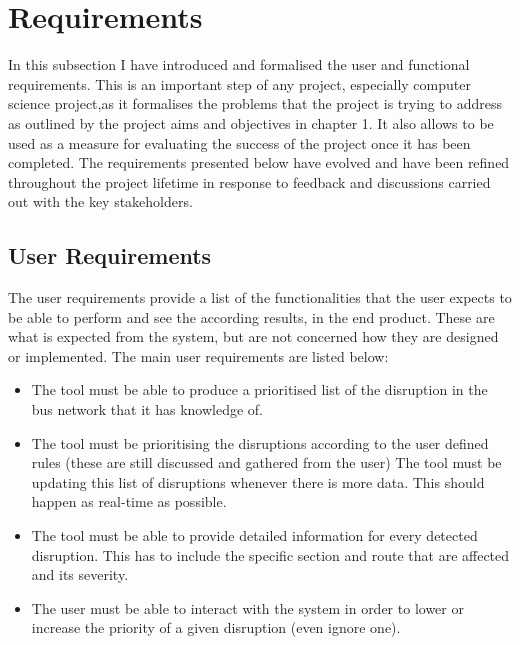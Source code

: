 \chapter{Requirements}
In this subsection I have introduced and formalised the user and functional requirements.
This is an important step of any project, especially computer science project,as it formalises the problems that the project is trying to address as outlined by the project aims and objectives in chapter 1. It also allows to be used as a measure for evaluating the success of the project once it has been completed. The requirements presented below have evolved and have been refined throughout the project lifetime in response to feedback and discussions carried out with the key stakeholders.

\section{User Requirements}
The user requirements provide a list of the functionalities that the user expects to be able to perform and see the according results, in the end product. These are what is expected from the system, but are not concerned how they are designed or implemented. The main user requirements are listed below:
\begin{itemize}
	\item The tool must be able to produce a prioritised list of the disruption in
the bus network that it has knowledge of.
	\item The tool must be prioritising the disruptions according to the user defined
rules (these are still discussed and gathered from the user)
The tool must be updating this list of disruptions whenever there is more
data. This should happen as real-time as possible.
	\item The tool must be able to provide detailed information for every detected disruption. This has to include the specific section and route that are affected and its severity.
	\item The user must be able to interact with the system in order to lower or
increase the priority of a given disruption (even ignore one).
\end{itemize}

